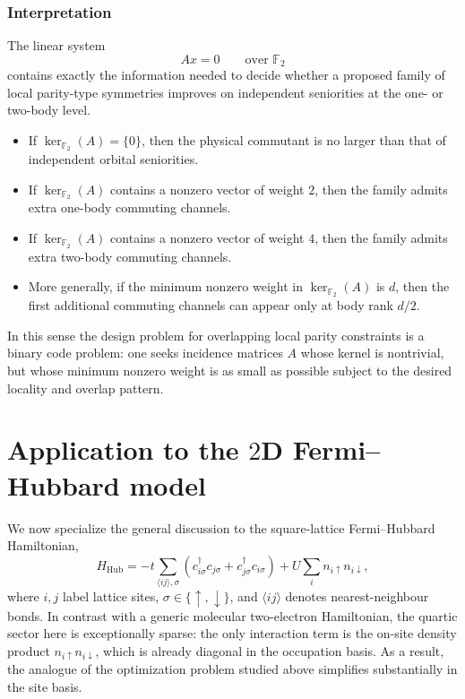 \documentclass[11pt]{article}
\newcommand{\F}{\mathbb{F}_2}
\theoremstyle{definition}
\theoremstyle{remark}
\begin{document}
\subsubsection{Interpretation}

The linear system
\begin{equation}
  A x = 0 \qquad \text{over }\F
\end{equation}
contains exactly the information needed to decide whether a proposed family of local parity-type symmetries
improves on independent seniorities at the one- or two-body level.

\begin{itemize}[leftmargin=2em]
  \item If $\ker_{\F}(A)=\{0\}$, then the physical commutant is no larger than that of independent orbital seniorities.
  \item If $\ker_{\F}(A)$ contains a nonzero vector of weight $2$, then the family admits extra one-body commuting channels.
  \item If $\ker_{\F}(A)$ contains a nonzero vector of weight $4$, then the family admits extra two-body commuting channels.
  \item More generally, if the minimum nonzero weight in $\ker_{\F}(A)$ is $d$, then the first additional commuting channels can appear only at body rank $d/2$.
\end{itemize}

In this sense the design problem for overlapping local parity constraints is a binary code problem:
one seeks incidence matrices $A$ whose kernel is nontrivial, but whose minimum nonzero weight is as small as possible subject to the desired locality and overlap pattern.

\section{Application to the $2$D Fermi--Hubbard model}

We now specialize the general discussion to the square-lattice Fermi--Hubbard Hamiltonian,
\begin{equation}
  H_{\mathrm{Hub}}
  =
  -t\sum_{\langle ij\rangle,\sigma}
  \left(c_{i\sigma}^\dagger c_{j\sigma}+c_{j\sigma}^\dagger c_{i\sigma}\right)
  +U\sum_i n_{i\uparrow}n_{i\downarrow},
  \label{eq:hubbard-main}
\end{equation}
where $i,j$ label lattice sites, $\sigma\in\{\uparrow,\downarrow\}$, and $\langle ij\rangle$ denotes nearest-neighbour bonds. In contrast with a generic molecular two-electron Hamiltonian, the quartic sector here is exceptionally sparse: the only interaction term is the on-site density product $n_{i\uparrow}n_{i\downarrow}$, which is already diagonal in the occupation basis. As a result, the analogue of the optimization problem studied above simplifies substantially in the site basis.
\end{document}
